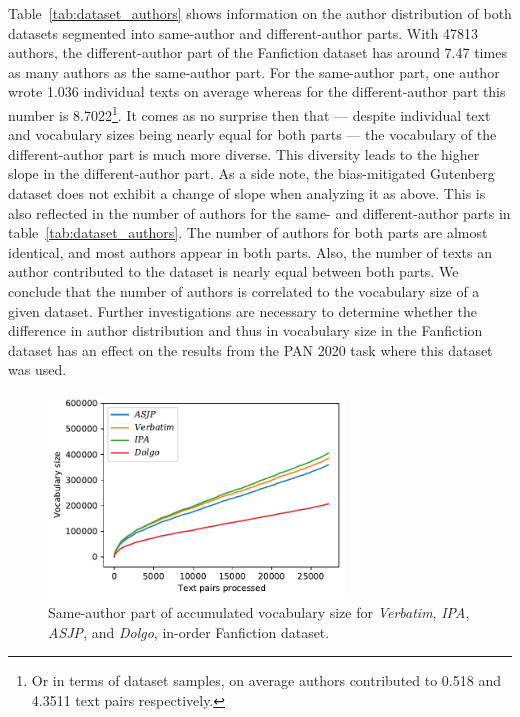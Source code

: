 Table~\ref{tab:dataset_authors} shows information on the author distribution of both datasets segmented into same-author and different-author parts.
With 47813 authors, the different-author part of the Fanfiction dataset has around 7.47 times as many authors as the same-author part.
For the same-author part, one author wrote 1.036 individual texts on average whereas for the different-author part this number is 8.7022\footnote{Or in terms of dataset samples, on average authors contributed to 0.518 and 4.3511 text pairs respectively.}.
It comes as no surprise then that --- despite individual text and vocabulary sizes being nearly equal for both parts --- the vocabulary of the different-author part is much more diverse.
This diversity leads to the higher slope in the different-author part.
As a side note, the bias-mitigated Gutenberg dataset does not exhibit a change of slope when analyzing it as above.
This is also reflected in the number of authors for the same- and different-author parts in table~\ref{tab:dataset_authors}.
The number of authors for both parts are almost identical, and most authors appear in both parts.
Also, the number of texts an author contributed to the dataset is nearly equal between both parts.
We conclude that the number of authors is correlated to the vocabulary size of a given dataset.
Further investigations are necessary to determine whether the difference in author distribution and thus in vocabulary size in the Fanfiction dataset has an effect on the results from the PAN 2020 task where this dataset was used.\\
\begin{figure}
  \centering
  \includegraphics[width=0.7\textwidth]{figures/cum_vocab_size_ff_inorder_onlysame_ipa}
  \caption{Same-author part of accumulated vocabulary size for \textit{Verbatim}, \textit{IPA}, \textit{ASJP}, and \textit{Dolgo}, in-order Fanfiction dataset.}
  \label{fig:cumvocab_same}
\end{figure}
